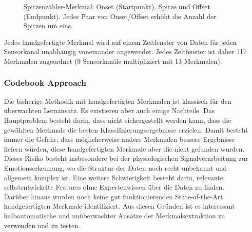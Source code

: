 \begin{figure}[h] 
\caption[Spitzenz{\"a}hler-Merkmal]{Spitzenz{\"a}hler-Merkmal: Onset (Startpunkt), Spitze und Offset (Endpunkt). Jedes Paar von Onset/Offset erh{\"o}ht die Anzahl der Spitzen um eins.} 
\label{fig:peaks} \end{figure} \vspace{0.5cm}


Jedes handgefertigte Merkmal wird auf einem Zeitfenster von Daten f{\"u}r jeden Sensorkanal unabh{\"a}ngig voneinander angewendet. 
Jedes Zeitfenster ist daher 117 Merkmalen zugeordnet (9 Sensorkan{\"a}le multipliziert mit 13 Merkmalen). \\





\subsubsection{Codebook Approach} \label{ca-1}


Die bisherige Methodik mit handgefertigten Merkmalen ist klassisch f{\"u}r den {\"u}berwachten Lernansatz. 
Es existieren aber auch einige Nachteile. 
Das Hauptproblem besteht darin, dass nicht sichergestellt werden kann, dass die gew{\"a}hlten Merkmale die besten Klassifizierungsergebnisse erzielen. Damit besteht immer die Gefahr, dass m{\"o}glicherweise andere Merkmalen bessere Ergebnisse liefern w{\"u}rden, diese handgefertigten Merkmale aber die  nicht gefunden wurden. Dieses Risiko besteht insbesondere bei der physiologischen Signalverarbeitung zur Emotionserkennung, wo die Struktur der Daten noch recht unbekannt und allgemein komplex ist. 
Eine weitere Schwierigkeit besteht darin, relevante selbstentwickelte Features ohne Expertenwissen {\"u}ber die Daten zu finden.
Dar{\"u}ber hinaus wurden noch keine gut funktionierenden State-of-the-Art handgefertigten Merkmale identifiziert.
Aus diesen Gr{\"u}nden ist es interessant halbautomatische und un{\"u}berwachter Ans{\"a}tze der Merkmalsextraktion zu verwenden und zu testen. \\


